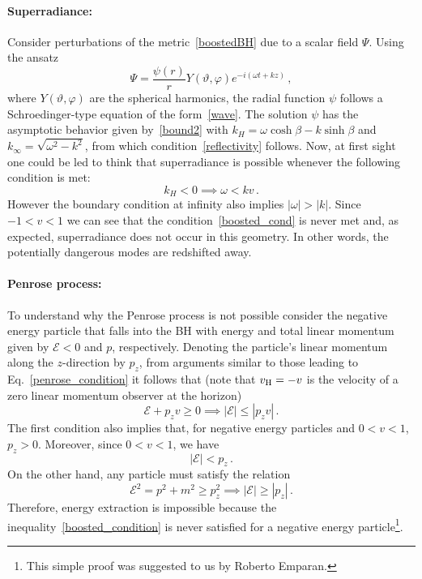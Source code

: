 \documentclass[11pt]{article}
\newcommand{\be}{\begin{equation}}
\newcommand{\ee}{\end{equation}}
\numberwithin{equation}{section} %
\begin{document}
\paragraph{Superradiance:} 
Consider perturbations of the metric~\eqref{boostedBH} due to a scalar field $\Psi$. Using the ansatz
%
\be
\Psi=\frac{\psi(r)}{r}Y(\vartheta,\varphi)e^{-i(\omega t+k z)}\,,
\ee
%
where $Y(\vartheta,\varphi)$ are the spherical harmonics, the radial function $\psi$ follows a Schroedinger-type equation of the form~\eqref{wave}. The solution $\psi$ has the asymptotic behavior given by~\eqref{bound2} with $k_H=\omega \cosh\beta-k\sinh\beta$ and $k_\infty=\sqrt{\omega^2-k^2}$, from which condition~\eqref{reflectivity} follows. Now, at first sight one could be led to think that superradiance is possible whenever the following condition is met:
%
\be\label{boosted_cond}
k_H<0\implies \omega<k v\,.
\ee
%
However the boundary condition at infinity also implies $|\omega|>|k|$. Since $-1<v<1$ we can see that the condition~\eqref{boosted_cond} is never met and, as expected, superradiance does not occur in this geometry. In other words, the potentially dangerous modes are redshifted away.


\paragraph{Penrose process:}

To understand why the Penrose process is not possible consider the negative energy particle that falls into the BH with energy and total linear momentum given by $\mathcal{E}<0$ and $p$, respectively. Denoting the particle's linear momentum along the $z$-direction by $p_z$, from arguments similar to those leading to Eq.~\eqref{penrose_condition} it follows that (note that $v_{\rm H}=-v$ is the velocity of a zero linear momentum observer at the horizon)
%
\be
\mathcal{E}+p_z v\geq 0 \implies |\mathcal{E}|\leq |p_z v|\,. 
\ee
%
The first condition also implies that, for negative energy particles and $0<v<1$, $p_z>0$. Moreover, since $0<v<1$, we have
%
\be\label{boosted_condition}
|\mathcal{E}|<p_z\,.
\ee
%
On the other hand, any particle must satisfy the relation
%
\be
\mathcal{E}^2=p^2+m^2\geq p_z^2 \implies |\mathcal{E}|\geq |p_z|\,.
\ee
%
Therefore, energy extraction is impossible because the inequality~\eqref{boosted_condition} is never satisfied for a negative energy particle\footnote{This simple proof was suggested to us by Roberto Emparan.}.
\end{document}
